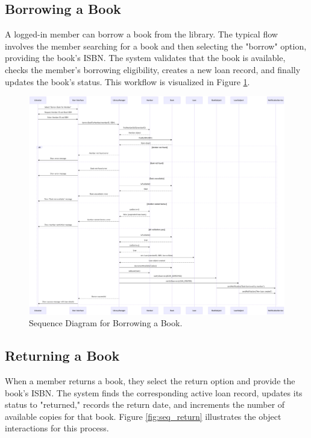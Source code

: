 \newpage

\subsection{Borrowing a Book}
A logged-in member can borrow a book from the library. The typical flow involves the member searching for a book and then selecting the "borrow" option, providing the book's ISBN. The system validates that the book is available, checks the member's borrowing eligibility, creates a new loan record, and finally updates the book's status. This workflow is visualized in Figure \ref{fig:seq_borrow}.

\begin{figure}[H]
	\centering
	\includegraphics[width=\textwidth]{figures/sequence_borrow.png}
	\caption{Sequence Diagram for Borrowing a Book.}
	\label{fig:seq_borrow}
\end{figure}

\newpage

\subsection{Returning a Book}
When a member returns a book, they select the return option and provide the book's ISBN. The system finds the corresponding active loan record, updates its status to "returned," records the return date, and increments the number of available copies for that book. Figure \ref{fig:seq_return} illustrates the object interactions for this process.

